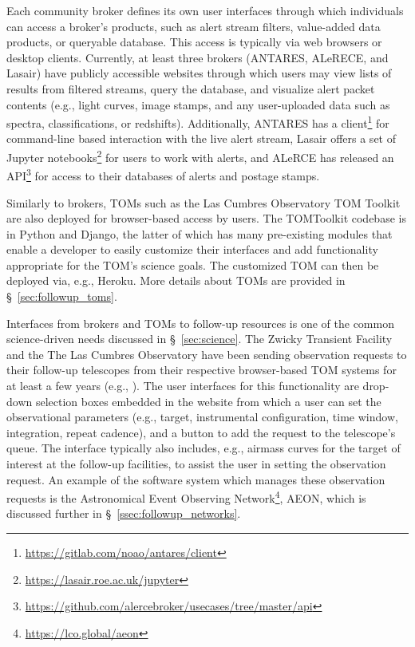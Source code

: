 Each community broker defines its own user interfaces through which individuals can access a broker's products, such as alert stream filters, value-added data products, or queryable database.
This access is typically via web browsers or desktop clients.
Currently, at least three brokers (ANTARES, ALeRECE, and Lasair) have publicly accessible websites through which users may view lists of results from filtered streams, query the database, and visualize alert packet contents (e.g., light curves, image stamps, and any user-uploaded data such as spectra, classifications, or redshifts).
Additionally, ANTARES has a client\footnote{\url{https://gitlab.com/noao/antares/client}} for command-line based interaction with the live alert stream, Lasair offers a set of {\sc Jupyter} notebooks\footnote{\url{https://lasair.roe.ac.uk/jupyter}} for users to work with alerts, and ALeRCE has released an API\footnote{\url{https://github.com/alercebroker/usecases/tree/master/api}} for access to their databases of alerts and postage stamps.

Similarly to brokers, TOMs such as the Las Cumbres Observatory TOM Toolkit \citep{2018SPIE10707E..11S} are also deployed for browser-based access by users.
The TOMToolkit codebase is in {\sc Python} and {\sc Django}, the latter of which has many pre-existing modules that enable a developer to easily customize their interfaces and add functionality appropriate for the TOM's science goals.
The customized TOM can then be deployed via, e.g., {\sc Heroku}. More details about TOMs are provided in \S~\ref{sec:followup_toms}.

Interfaces from brokers and TOMs to follow-up resources is one of the common science-driven needs discussed in \S~\ref{sec:science}.
The Zwicky Transient Facility and the The Las Cumbres Observatory have been sending observation requests to their follow-up telescopes from their respective browser-based TOM systems for at least a few years (e.g., \citealt{2018SPIE10707E..11S}).
The user interfaces for this functionality are drop-down selection boxes embedded in the website from which a user can set the observational parameters (e.g., target, instrumental configuration, time window, integration, repeat cadence), and a button to add the request to the telescope's queue.
The interface typically also includes, e.g., airmass curves for the target of interest at the follow-up facilities, to assist the user in setting the observation request.
An example of the software system which manages these observation requests is the Astronomical Event Observing Network\footnote{\url{https://lco.global/aeon}}, AEON, which is discussed further in \S~\ref{ssec:followup_networks}.

